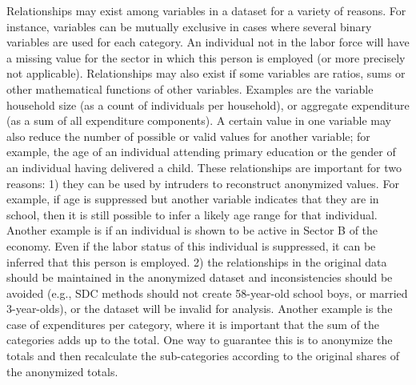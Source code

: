\documentclass[letterpaper,10pt,english]{sphinxmanual}
\begin{document}
Relationships may exist among variables in a dataset for a variety of
reasons. For instance, variables can be mutually exclusive in cases
where several binary variables are used for each category. An individual
not in the labor force will have a missing value for the sector in which
this person is employed (or more precisely not applicable).
Relationships may also exist if some variables are ratios, sums or other
mathematical functions of other variables. Examples are the variable
household size (as a count of individuals per household), or aggregate
expenditure (as a sum of all expenditure components). A certain value in
one variable may also reduce the number of possible or valid values for
another variable; for example, the age of an individual attending
primary education or the gender of an individual having delivered a
child. These relationships are important for two reasons: 1) they can be
used by intruders to reconstruct anonymized values. For example, if age
is suppressed but another variable indicates that they are in school,
then it is still possible to infer a likely age range for that
individual. Another example is if an individual is shown to be active in
Sector B of the economy. Even if the labor status of this individual is
suppressed, it can be inferred that this person is employed. 2) the
relationships in the original data should be maintained in the
anonymized dataset and inconsistencies should be avoided (e.g., SDC
methods should not create 58-year-old school boys, or married
3-year-olds), or the dataset will be invalid for analysis. Another
example is the case of expenditures per category, where it is important
that the sum of the categories adds up to the total. One way to
guarantee this is to anonymize the totals and then recalculate the
sub-categories according to the original shares of the anonymized
totals.
\end{document}
